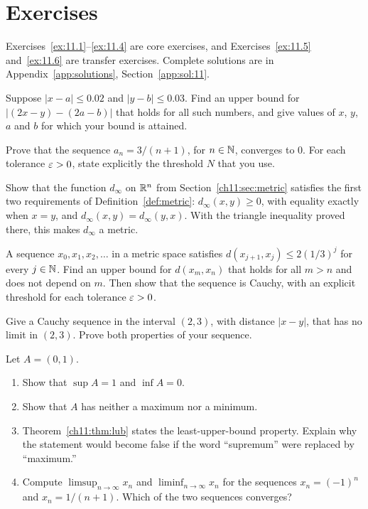 \section*{Exercises}
Exercises~\ref{ex:11.1}--\ref{ex:11.4} are core exercises, and Exercises~\ref{ex:11.5} and~\ref{ex:11.6} are transfer exercises. Complete solutions are in Appendix~\ref{app:solutions}, Section~\ref{app:sol:11}.
\begin{exercise}\label{ex:11.1}Suppose $|x-a|\le0.02$ and $|y-b|\le0.03$. Find an upper bound for $|(2x-y)-(2a-b)|$ that holds for all such numbers, and give values of $x$, $y$, $a$ and $b$ for which your bound is attained.\end{exercise}
\begin{exercise}\label{ex:11.2}Prove that the sequence $a_n=3/(n+1)$, for $n\in\mathbb N$, converges to $0$. For each tolerance $\varepsilon>0$, state explicitly the threshold $N$ that you use.\end{exercise}
\begin{exercise}\label{ex:11.3}Show that the function $d_\infty$ on $\mathbb R^n$ from Section~\ref{ch11:sec:metric} satisfies the first two requirements of Definition~\ref{def:metric}: $d_\infty(x,y)\ge0$, with equality exactly when $x=y$, and $d_\infty(x,y)=d_\infty(y,x)$. With the triangle inequality proved there, this makes $d_\infty$ a metric.\end{exercise}
\begin{exercise}\label{ex:11.4}A sequence $x_0,x_1,x_2,\ldots$ in a metric space satisfies $d(x_{j+1},x_j)\le2(1/3)^j$ for every $j\in\mathbb N$. Find an upper bound for $d(x_m,x_n)$ that holds for all $m>n$ and does not depend on $m$. Then show that the sequence is Cauchy, with an explicit threshold for each tolerance $\varepsilon>0$.\end{exercise}
\begin{exercise}\label{ex:11.5}Give a Cauchy sequence in the interval $(2,3)$, with distance $|x-y|$, that has no limit in $(2,3)$. Prove both properties of your sequence.\end{exercise}
\begin{exercise}\label{ex:11.6}Let $A=(0,1)$.
\begin{enumerate}
\item Show that $\sup A=1$ and $\inf A=0$.
\item Show that $A$ has neither a maximum nor a minimum.
\item Theorem~\ref{ch11:thm:lub} states the least-upper-bound property. Explain why the statement would become false if the word ``supremum'' were replaced by ``maximum.''
\item Compute $\limsup_{n\to\infty}x_n$ and $\liminf_{n\to\infty}x_n$ for the sequences $x_n=(-1)^n$ and $x_n=1/(n+1)$. Which of the two sequences converges?
\end{enumerate}
\end{exercise}
